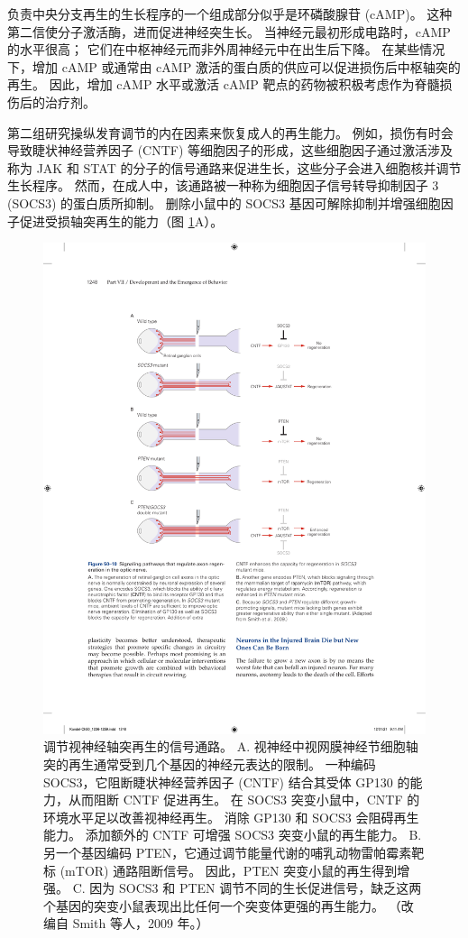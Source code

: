 负责中央分支再生的生长程序的一个组成部分似乎是环磷酸腺苷 (cAMP)。 这种第二信使分子激活酶，进而促进神经突生长。 当神经元最初形成电路时，cAMP 的水平很高； 它们在中枢神经元而非外周神经元中在出生后下降。 在某些情况下，增加 cAMP 或通常由 cAMP 激活的蛋白质的供应可以促进损伤后中枢轴突的再生。 因此，增加 cAMP 水平或激活 cAMP 靶点的药物被积极考虑作为脊髓损伤后的治疗剂。

第二组研究操纵发育调节的内在因素来恢复成人的再生能力。 例如，损伤有时会导致睫状神经营养因子 (CNTF) 等细胞因子的形成，这些细胞因子通过激活涉及称为 JAK 和 STAT 的分子的信号通路来促进生长，这些分子会进入细胞核并调节生长程序。 然而，在成人中，该通路被一种称为细胞因子信号转导抑制因子 3 (SOCS3) 的蛋白质所抑制。 删除小鼠中的 SOCS3 基因可解除抑制并增强细胞因子促进受损轴突再生的能力（图 \ref{fig:50_10}A）。

\begin{figure}[htbp]
	\centering
	\includegraphics[width=0.7\linewidth]{chap50/fig_50_10}
	\caption{调节视神经轴突再生的信号通路。 A. 视神经中视网膜神经节细胞轴突的再生通常受到几个基因的神经元表达的限制。 一种编码 SOCS3，它阻断睫状神经营养因子 (CNTF) 结合其受体 GP130 的能力，从而阻断 CNTF 促进再生。 在 SOCS3 突变小鼠中，CNTF 的环境水平足以改善视神经再生。 消除 GP130 和 SOCS3 会阻碍再生能力。 添加额外的 CNTF 可增强 SOCS3 突变小鼠的再生能力。 B. 另一个基因编码 PTEN，它通过调节能量代谢的哺乳动物雷帕霉素靶标 (mTOR) 通路阻断信号。 因此，PTEN 突变小鼠的再生得到增强。 C. 因为 SOCS3 和 PTEN 调节不同的生长促进信号，缺乏这两个基因的突变小鼠表现出比任何一个突变体更强的再生能力。 （改编自 Smith 等人，2009 年。）}
	\label{fig:50_10}
\end{figure}

